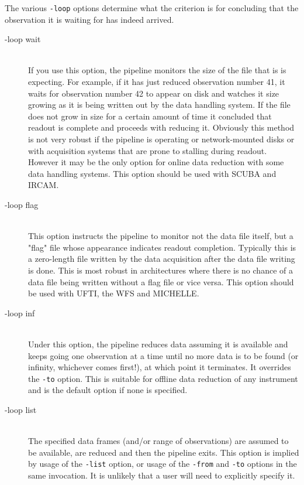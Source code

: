 \documentclass[twoside,11pt]{article}
\renewcommand{\_}{\texttt{\symbol{95}}}
\begin{document}
The various {\tt -loop} options determine what the criterion is for
concluding that the observation it is waiting for has indeed arrived.

\begin{description}

\item[-loop wait]%
%
\hfil\\
If you use this option, the pipeline monitors the size of the file
that is is expecting. For example, if it has just reduced observation
number 41, it waits for observation number 42 to appear on disk and
watches it size growing as it is being written out by the data
handling system. If the file does not grow in size for a certain
amount of time it concluded that readout is complete and proceeds with
reducing it. Obviously this method is not very robust if the pipeline
is operating or network-mounted disks or with acquisition systems that
are prone to stalling during readout. However it may be the only
option for online data reduction with some data handling systems. This
option should be used with SCUBA and IRCAM.

\item[-loop flag]%
%
\hfil\\
This option instructs the pipeline to monitor not the data file
itself, but a "flag" file whose appearance indicates readout
completion. Typically this is a zero-length file written by the data
acquisition after the data file writing is done. This is most robust
in architectures where there is no chance of a data file being written
without a flag file or vice versa. This option should be used with
UFTI, the WFS and MICHELLE.

\item[-loop inf]%
%
\hfil\\
Under this option, the pipeline reduces data assuming it is available
and keeps going one observation at a time until no more data is to be
found (or infinity, whichever comes first!), at which point it
terminates. It overrides the {\tt -to} option. This is suitable for offline
data reduction of any instrument and is the default option if none is
specified.

\item[-loop list]%
%
\hfil\\
The specified data frames (and/or range of observations) are assumed
to be available, are reduced and then the pipeline exits. This option
is implied by usage of the {\tt -list} option, or usage of the {\tt -from}
and {\tt -to} options in the same invocation. It is unlikely that a user
will need to explicitly specify it.

\end{description}
\end{document}
